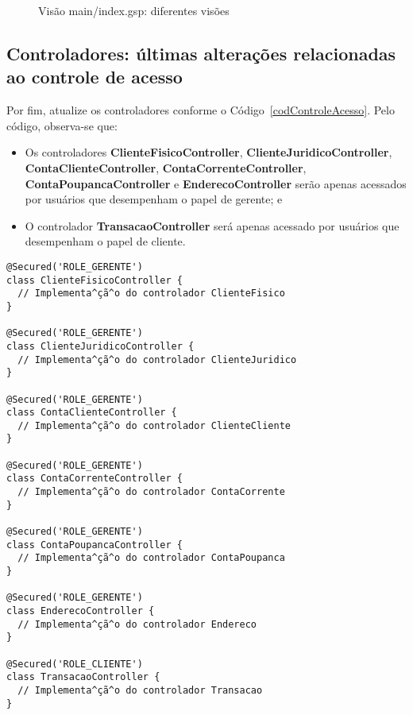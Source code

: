 \newpage

\begin{figure}[htbp]
\center
{}
\qquad
{}
\caption{Visão main/index.gsp: diferentes visões}
\label{figVisao}
\end{figure}

\subsection{Controladores: últimas alterações relacionadas ao controle de acesso}

\vspace{0.3cm}

Por  fim, atualize os  controladores conforme  o Código~\ref{codControleAcesso}.
Pelo código, observa-se que: 

\vspace{0.3cm}

\begin{itemize}


\item      Os     controladores     {\bf      ClienteFisicoController},     {\bf
  ClienteJuridicoController},       {\bf      ContaClienteController},      {\bf
  ContaCorrenteController},     {\bf     ContaPoupancaController}     e     {\bf
  EnderecoController}  serão apenas  acessados  por usuários  que desempenham  o
  papel de gerente; e 

\vspace{0.3cm}

\item O controlador {\bf  TransacaoController} será apenas acessado por usuários
  que desempenham o papel de cliente.

\end{itemize}

\begin{lstlisting}[caption=Controladores  - últimas  alterações  relacionadas ao
    Controle de Acesso, frame = trBL,float=htbp, label=codControleAcesso] 
@Secured('ROLE_GERENTE')
class ClienteFisicoController {
  // Implementa^çã^o do controlador ClienteFisico
}

@Secured('ROLE_GERENTE')
class ClienteJuridicoController {
  // Implementa^çã^o do controlador ClienteJuridico
}

@Secured('ROLE_GERENTE')
class ContaClienteController {
  // Implementa^çã^o do controlador ClienteCliente
}

@Secured('ROLE_GERENTE')
class ContaCorrenteController {
  // Implementa^çã^o do controlador ContaCorrente
}

@Secured('ROLE_GERENTE')
class ContaPoupancaController {
  // Implementa^çã^o do controlador ContaPoupanca
}

@Secured('ROLE_GERENTE')
class EnderecoController {
  // Implementa^çã^o do controlador Endereco
}

@Secured('ROLE_CLIENTE')
class TransacaoController {
  // Implementa^çã^o do controlador Transacao
}
\end{lstlisting}

